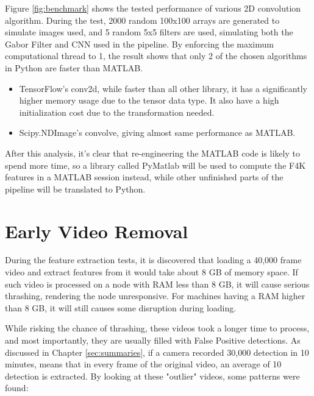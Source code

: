 \documentclass[bsc,logo,twoside,fullspacing,parskip]{infthesis}
\begin{document}
Figure \ref{fig:benchmark} shows the tested performance of various 2D convolution algorithm. During the test, 2000 random 100x100 arrays are generated to simulate images used, and 5 random 5x5 filters are used, simulating both the Gabor Filter and CNN used in the pipeline. By enforcing the maximum computational thread to 1, the result shows that only 2 of the chosen algorithms in Python are faster than MATLAB.
\begin{itemize}
\item
TensorFlow's conv2d, while faster than all other library, it has a significantly higher memory usage due to the tensor data type. It also have a high initialization cost due to the transformation needed.
\item
Scipy.NDImage's convolve, giving almost same performance as MATLAB.
\end{itemize}

After this analysis, it's clear that re-engineering the MATLAB code is likely to spend more time, so a library called PyMatlab will be used to compute the F4K features in a MATLAB session instead, while other unfinished parts of the pipeline will be translated to Python.

\section{Early Video Removal}

During the feature extraction tests, it is discovered that loading a 40,000 frame video and extract features from it would take about 8 GB of memory space. 
If such video is processed on a node with RAM less than 8 GB, it will cause serious thrashing, rendering the node unresponsive. For machines having a RAM higher than 8 GB, it will still causes some disruption during loading.  

While risking the chance of thrashing, these videos took a longer time to process, and most importantly, they are usually filled with False Positive detections. As discussed in Chapter \ref{sec:summaries}, if a camera recorded 30,000 detection in 10 minutes, means that in every frame of the original video, an average of 10 detection is extracted. By looking at these "outlier" videos, some patterns were found:
\end{document}
